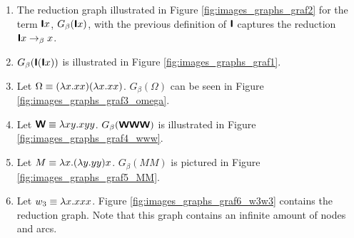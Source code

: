 \begin{example}\mbox{}
	\begin{enumerate}
		\item The reduction graph illustrated in Figure \ref{fig:images_graphs_graf2}
		for the term $\textsf{\textbf{I}} x$, $G_\beta(\textsf{\textbf{I}} x)$, with
		the previous definition of $\textsf{\textbf{I}}$ captures the reduction $\textsf{\textbf{I}} x\rightarrow_\beta x$.
		
		\item $G_\beta(\textsf{\textbf{I}}(\textsf{\textbf{I}} x))$ is illustrated in Figure \ref{fig:images_graphs_graf1}.
		
		\item Let $\Omega\equiv(\lambda x.xx)(\lambda x.xx)$. $G_\beta(\Omega)$
		can be seen in Figure \ref{fig:images_graphs_graf3_omega}.
		
		\item Let $\textsf{\textbf{W}}\equiv\lambda xy.xyy$. $G_\beta(\textsf{\textbf{W}}\textsf{\textbf{W}}\textsf{\textbf{W}})$ is illustrated in
		Figure \ref{fig:images_graphs_graf4_www}.
		
		\item Let $M\equiv\lambda x.(\lambda y.yy)x$. $G_\beta(MM)$ is pictured in
		Figure \ref{fig:images_graphs_graf5_MM}.
		
		\item Let $w_3\equiv\lambda x.xxx$. Figure \ref{fig:images_graphs_graf6_w3w3}
		contains the reduction graph. Note that this graph contains an infinite 
		amount of nodes and arcs.
		

\end{enumerate}
\end{example}
